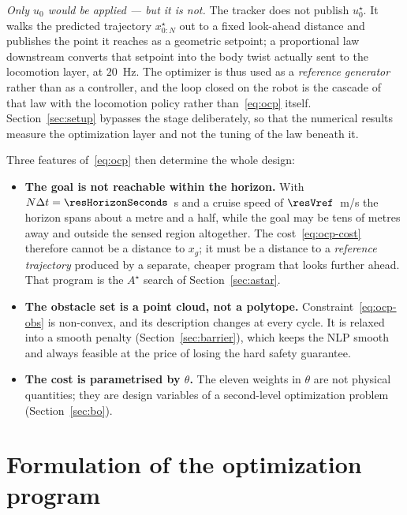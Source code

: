 \documentclass[11pt,a4paper]{article}
\newcommand{\astar}{$A^\star$}
\begin{document}
\emph{Only $u_0$ would be applied --- but it is not.} The tracker does not publish $u^\star_0$. It walks the
predicted trajectory $x^\star_{0:N}$ out to a fixed look-ahead distance and publishes the point it reaches as
a geometric setpoint; a proportional law downstream converts that setpoint into the body twist actually sent
to the locomotion layer, at $20$~Hz. The optimizer is thus used as a \emph{reference generator} rather than
as a controller, and the loop closed on the robot is the cascade of that law with the locomotion policy
rather than~\eqref{eq:ocp} itself. Section~\ref{sec:setup} bypasses the stage deliberately, so that the
numerical results measure the optimization layer and not the tuning of the law beneath it.

Three features of~\eqref{eq:ocp} then determine the whole design:

\begin{itemize}
  \item \textbf{The goal is not reachable within the horizon.} With $N\Delta t=\resHorizonSeconds$~s and a
        cruise speed of $\resVref$~m/s the horizon spans about a metre and a half, while the goal may be tens of metres away
        and outside the sensed region altogether. The cost~\eqref{eq:ocp-cost} therefore cannot be a distance to $x_g$; it
        must be a distance to a \emph{reference trajectory} produced by a separate, cheaper program that
        looks further ahead. That program is the \astar{} search of Section~\ref{sec:astar}.
  \item \textbf{The obstacle set is a point cloud, not a polytope.} Constraint~\eqref{eq:ocp-obs} is
        non-convex, and its description changes at every cycle. It is relaxed into a smooth penalty
        (Section~\ref{sec:barrier}), which keeps the NLP smooth and always feasible at the price of losing
        the hard safety guarantee.
  \item \textbf{The cost is parametrised by $\theta$.} The eleven weights in $\theta$ are not physical
        quantities; they are design variables of a second-level optimization problem
        (Section~\ref{sec:bo}).
\end{itemize}

\section{Formulation of the optimization program}
\label{sec:formulation}
\end{document}
